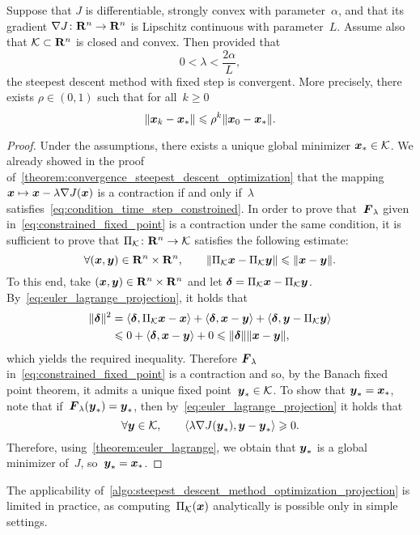 \begin{theorem}
    \label{theorem:convergence_steepest_descent_optimization_constraint}
    Suppose that $J$ is differentiable, strongly convex with parameter~$\alpha$,
    and that its gradient $\nabla J \colon \mathbf R^n \to \mathbf R^n$ is Lipschitz continuous with parameter~$L$.
    Assume also that $\mathcal K \subset \mathbf R^n$ is closed and convex.
    Then provided that
    \begin{equation}
        \label{eq:condition_time_step_constroined}
        0 < \lambda < \frac{2 \alpha}{L},
    \end{equation}
    the steepest descent method with fixed step is convergent.
    More precisely,
    there exists $\rho \in (0, 1)$ such that for all~$k \geq 0$
    \begin{equation*}
        \lVert\mathbf{\boldsymbol{x}}_k - \mathbf{\boldsymbol{x}}_*\rVert \leqslant \rho^k \lVert\mathbf{\boldsymbol{x}}_0 - \mathbf{\boldsymbol{x}}_*\rVert.
    \end{equation*}
\end{theorem}
\begin{proof}
    Under the assumptions,
    there exists a unique global minimizer $\mathbf{\boldsymbol{x}}_* \in \mathcal K$.
    We already showed in the proof of~\cref{theorem:convergence_steepest_descent_optimization} that the mapping $\mathbf{\boldsymbol{x}} \mapsto \mathbf{\boldsymbol{x}} - \lambda \nabla J(\mathbf{\boldsymbol{x}})$ is a contraction if and only if~$\lambda$ satisfies~\eqref{eq:condition_time_step_constroined}.
    In order to prove that~$\mathbf{\boldsymbol{F}}_{\lambda}$ given in~\eqref{eq:constrained_fixed_point} is a contraction under the same condition,
    it is sufficient to prove that $\Pi_{\mathcal K} \colon \mathbf R^n \to \mathcal K$ satisfies the following estimate:
    \[
        \forall (\mathbf{\boldsymbol{x}}, \mathbf{\boldsymbol{y}}) \in \mathbf R^n \times \mathbf R^n, \qquad
        \lVert\Pi_{\mathcal K} \mathbf{\boldsymbol{x}} - \Pi_{\mathcal K} \mathbf{\boldsymbol{y}}\rVert \leqslant \lVert\mathbf{\boldsymbol{x}} - \mathbf{\boldsymbol{y}}\rVert.
    \]
    To this end, take $(\mathbf{\boldsymbol{x}}, \mathbf{\boldsymbol{y}}) \in \mathbf R^n \times \mathbf R^n$ and let $\mathbf{\boldsymbol{\delta}} = \Pi_{\mathcal K} \mathbf{\boldsymbol{x}} - \Pi_{\mathcal K} \mathbf{\boldsymbol{y}}$.
    By~\eqref{eq:euler_lagrange_projection},
    it holds that
    \begin{align*}
        \lVert\mathbf{\boldsymbol{\delta}}\rVert^2
        &= \langle\mathbf{\boldsymbol{\delta}}, \Pi_{\mathcal K} \mathbf{\boldsymbol{x}} - \mathbf{\boldsymbol{x}}\rangle + \langle\mathbf{\boldsymbol{\delta}}, \mathbf{\boldsymbol{x}} - \mathbf{\boldsymbol{y}}\rangle + \langle\mathbf{\boldsymbol{\delta}}, \mathbf{\boldsymbol{y}} - \Pi_{\mathcal K} \mathbf{\boldsymbol{y}}\rangle \\
        &\leqslant 0 + \langle\mathbf{\boldsymbol{\delta}}, \mathbf{\boldsymbol{x}} - \mathbf{\boldsymbol{y}}\rangle + 0 \leqslant \lVert\mathbf{\boldsymbol{\delta}}\rVert \lVert\mathbf{\boldsymbol{x}} - \mathbf{\boldsymbol{y}}\rVert,
    \end{align*}
    which yields the required inequality.
    Therefore $\mathbf{\boldsymbol{F}}_{\lambda}$ in~\eqref{eq:constrained_fixed_point} is a contraction and so,
    by the Banach fixed point theorem, it admits a unique fixed point~$\mathbf{\boldsymbol{y}}_* \in \mathcal K$.
    To show that $\mathbf{\boldsymbol{y}}_* = \mathbf{\boldsymbol{x}}_*$, note that if~$\mathbf{\boldsymbol{F}}_{\lambda}(\mathbf{\boldsymbol{y}}_*) = \mathbf{\boldsymbol{y}}_*$,
    then by~\eqref{eq:euler_lagrange_projection} it holds that
    \[
        \forall \mathbf{\boldsymbol{y}} \in \mathcal K,
        \qquad \langle\lambda \nabla J(\mathbf{\boldsymbol{y}}_*), \mathbf{\boldsymbol{y}} - \mathbf{\boldsymbol{y}}_*\rangle \geqslant 0.
    \]
    Therefore, using~\cref{theorem:euler_lagrange}, we obtain that $\mathbf{\boldsymbol{y}}_*$ is a global minimizer of~$J$,
    so~$\mathbf{\boldsymbol{y}}_* = \mathbf{\boldsymbol{x}}_*$.
\end{proof}

\begin{remark}
    The applicability of~\cref{algo:steepest_descent_method_optimization_projection} is limited in practice,
    as computing~$\Pi_{\mathcal K}(\mathbf{\boldsymbol{x}})$ analytically is possible only in simple settings.
\end{remark}
